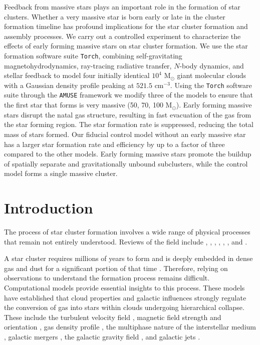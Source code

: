 \documentclass[twoside]{drexel-thesis}
\begin{document}
\begin{thesis}
Feedback from massive stars plays an important role in the formation of star clusters. Whether a very massive star is born early or late in the cluster formation timeline has profound implications for the star cluster formation and assembly processes. We carry out a controlled experiment to characterize the effects of early forming massive stars on star cluster formation. We use the star formation software suite \texttt{Torch}, combining self-gravitating magnetohydrodynamics, ray-tracing radiative transfer, $N$-body dynamics, and stellar feedback to model four initially identical $10^4$ M$_\odot$ giant molecular clouds with a Gaussian density profile peaking at $521.5 \mbox{ cm}^{-3}$. Using the \texttt{Torch} software suite through the \texttt{AMUSE} framework we modify three of the models to ensure that the first star that forms is very massive (50, 70, 100 M$_\odot$).
Early forming massive stars disrupt the natal gas structure, resulting in fast evacuation of the gas from the star forming region. The star formation rate is suppressed, reducing the total mass of stars formed.  Our fiducial control model without an early massive star has a larger star formation rate and efficiency by up to a factor of three compared to the other models. 
Early forming massive stars promote the buildup of spatially separate and gravitationally unbound subclusters, while the control model forms a single massive cluster. 


\section{Introduction}
\label{sec:p1-intro}
The process of star cluster formation involves a wide range of physical processes that remain not entirely understood. Reviews of the field include \citet{mac_low_control_2004}, \citet{mckee_theory_2007}, \citet{portegies_zwart_young_2010}, \citet{klessen_physical_2016}, \citet{krumholz_star_2019}, \citet{girichidis_physical_2020}, and \citet{krause_physics_2020}. 

A star cluster requires millions of years to form and is deeply embedded in dense gas and dust for a significant portion of that time \citep{lada_embedded_2003,chevance_molecular_2020}. Therefore, relying on observations to understand the formation process remains difficult. Computational models provide essential insights to this process. These models have established that cloud properties and galactic influences strongly regulate the conversion of gas into stars within clouds undergoing hierarchical collapse.
These include the turbulent velocity field \citep{ostriker_kinetic_1999,klessen_gravitational_2000}, magnetic field strength and orientation \citep{mckee_dynamical_1999}, gas density profile \citep{chen_effects_2021}, the multiphase nature of the interstellar medium \citep[ISM;][]{ostriker_regulation_2010}, galactic mergers \citep{dobbs_formation_2020}, the galactic gravity field \citep{li_star_2019}, and galactic jets \citep{mandal_impact_2021}.


\end{thesis}
\end{document}
